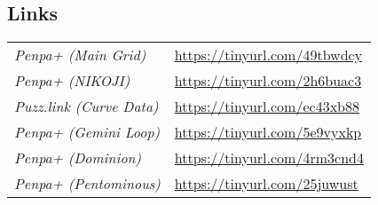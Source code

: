 \subsection*{Links}
\begin{tabularx}{\textwidth}{l X}
\emph{Penpa+ (Main Grid)} & \url{https://tinyurl.com/49tbwdcy} \\
\emph{Penpa+ (NIKOJI)} & \url{https://tinyurl.com/2h6buac3} \\
\emph{Puzz.link (Curve Data)} & \url{https://tinyurl.com/ec43xb88} \\
\emph{Penpa+ (Gemini Loop)} & \url{https://tinyurl.com/5e9vyxkp} \\
\emph{Penpa+ (Dominion)} & \url{https://tinyurl.com/4rm3cnd4} \\
\emph{Penpa+ (Pentominous)} & \url{https://tinyurl.com/25juwust} \\
\end{tabularx}
\pagebreak

